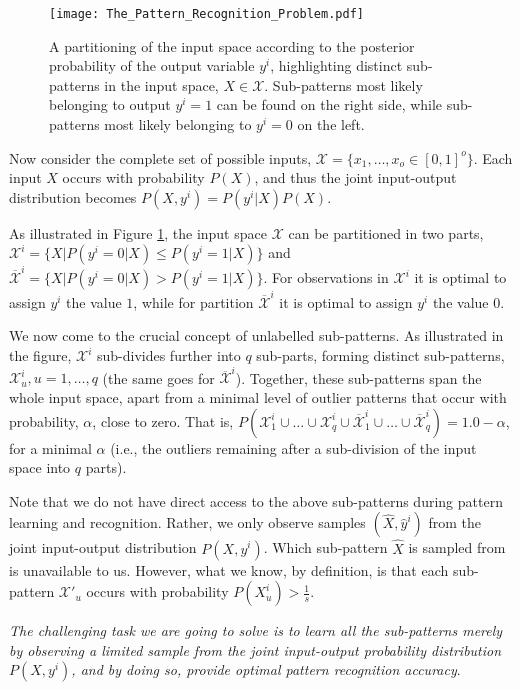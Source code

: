 \documentclass[11pt,a4paper]{article}
\newcommand{\True}{\mbox{1}}
\newcommand{\False}{\mbox{0}}
\begin{document}
\begin{figure}[!th]
\centering
\texttt{[image: The\_Pattern\_Recognition\_Problem.pdf]}
\caption{A partitioning of the input space according to the posterior probability of the output variable $y^i$, highlighting distinct sub-patterns in the input space, $X \in \mathcal{X}$. Sub-patterns most likely belonging to output $y^i = 1$ can be found on the right side, while sub-patterns most likely belonging to $y^i = 0$ on the left.}
\label{figure:classification_problem}
\end{figure}

Now consider the complete set of possible inputs, $\mathcal{X} = \{x_1, \ldots, x_o \in [\False, \True]^o\}$. Each input $X$ occurs with probability $P(X)$, and thus the joint input-output distribution becomes $P(X, y^i) = P(y^i | X)P(X)$. 

As illustrated in Figure \ref{figure:classification_problem}, the input space $\mathcal{X}$ can be partitioned in two parts, $\mathcal{X}^i = \{X | P(y^i = \False | X) \le P(y^i = \True | X)\}$ and $\overline{\mathcal{X}}^i = \{X | P(y^i = \False | X) > P(y^i = \True | X)\}$. For observations in $\mathcal{X}^i$ it is optimal to assign $y^i$ the value $\True$, while for partition $\overline{\mathcal{X}}^i$ it is optimal to assign $y^i$ the value $\False$.

We now come to the crucial concept of unlabelled sub-patterns. As illustrated in the figure, $\mathcal{X}^i$ sub-divides further into $q$ sub-parts, forming distinct sub-patterns, $\mathcal{X}^i_u, u=1,\ldots, q$ (the same goes for $\overline{\mathcal{X}}^i$). Together, these sub-patterns span the whole input space, apart from a minimal level of outlier patterns that occur with probability, $\alpha$, close to zero. That is, $P(\mathcal{X}^i_1 \cup \ldots \cup \mathcal{X}^i_q \cup \overline{\mathcal{X}}^i_1 \cup \ldots \cup \overline{\mathcal{X}}^i_q) = 1.0 - \alpha$, for a minimal $\alpha$ (i.e., the outliers remaining after a sub-division of the input space into $q$ parts).

Note that we do not have direct access to the above sub-patterns during pattern learning and recognition. Rather, we only observe samples $(\hat{X}, \hat{y}^i)$
from the joint input-output distribution $P(X, y^i)$. Which sub-pattern $\hat{X}$ is sampled from is unavailable to us. However, what we know, by definition, is that each sub-pattern $\mathcal{X}'_u$ occurs with probability $P(X^i_u) > \frac{1}{s}$.

\emph{The challenging task we are going to solve is to learn all the sub-patterns merely by observing a limited sample from the joint input-output probability distribution $P(X, y^i)$, and by doing so, provide optimal pattern recognition accuracy}.
\end{document}
